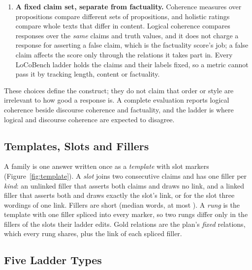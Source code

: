\documentclass[11pt]{article}
\begin{document}
\begin{enumerate}[leftmargin=1.4em,itemsep=1pt,topsep=2pt]
   ladder, none of whose rungs contradicts anything, rises only because links are added.
\item \textbf{A fixed claim set, separate from factuality.} Coherence measures over propositions
  compare different sets of propositions, and holistic ratings compare whole texts that differ in
  content. Logical coherence compares responses over the \emph{same} claims and truth values, and it
  does not charge a response for asserting a false claim, which is the factuality score's job;
  a false claim affects the score only through the relations it takes part in. Every LoCoBench ladder holds the claims
  and their labels fixed, so a metric cannot pass it by tracking length, content or factuality.
\end{enumerate}
These choices define the construct; they do not claim that order or style are irrelevant to how
good a response is. A complete evaluation reports logical coherence beside discourse coherence and
factuality, and the  ladder is where logical and discourse coherence are expected to
disagree.

\subsection{Templates, Slots and Fillers}
\label{sec:slots}

A family is one answer written once as a \emph{template} with slot markers
(Figure~\ref{fig:template}). A \emph{slot} joins two consecutive claims and has one filler per
\emph{kind}: an unlinked filler that asserts both claims and draws no link, and a linked filler
that asserts both and draws exactly the slot's link, or for the  slot three wordings
of one link. Fillers are short (median \lbFillerWordsMedian{} words, at most \lbFillerWordsMax).
A \emph{rung} is the template with one filler spliced into every marker, so two rungs differ only
in the fillers of the slots their ladder edits. Gold relations are the plan's \emph{fixed}
relations, which every rung shares, plus the link of each spliced filler.

\subsection{Five Ladder Types}
\label{sec:types}


\end{document}
